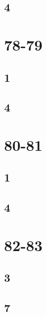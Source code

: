 \documentclass{article}
\begin{document}
\subsection*{4}

\section*{78-79}
\subsection*{1}
\subsection*{4}

\section*{80-81}
\subsection*{1}
\subsection*{4}

\section*{82-83}
\subsection*{3}
\subsection*{7}
\end{document}

